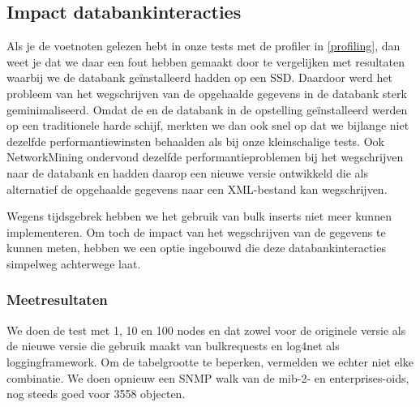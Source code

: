\subsection{Impact databankinteracties}
\label{impact-db}


Als je de voetnoten gelezen hebt in onze tests met de profiler in \cref{profiling},
dan weet je dat we daar een fout hebben gemaakt door te vergelijken met resultaten waarbij we de databank geïnstalleerd hadden op een SSD.
Daardoor werd het probleem van het wegschrijven van de opgehaalde gegevens in de databank sterk geminimaliseerd.
Omdat de \nwmretriever{} en de databank in de \vwall{}opstelling geïnstalleerd werden op een traditionele harde schijf,
merkten we dan ook snel op dat we bijlange niet dezelfde performantiewinsten behaalden als bij onze kleinschalige tests.
Ook NetworkMining ondervond dezelfde performantieproblemen bij het wegschrijven naar de databank en hadden daarop een nieuwe versie ontwikkeld die als alternatief
de opgehaalde gegevens naar een XML-bestand kan wegschrijven.

Wegens tijdsgebrek hebben we het gebruik van bulk inserts niet meer kunnen implementeren.
Om toch de impact van het wegschrijven van de gegevens te kunnen meten,
hebben we een optie ingebouwd die deze databankinteracties simpelweg achterwege laat.

\subsubsection{Meetresultaten}

We doen de test met 1, 10 en 100 nodes en dat zowel voor de originele versie als de nieuwe versie die gebruik maakt van bulkrequests en log4net als loggingframework.
Om de tabelgrootte te beperken, vermelden we echter niet elke combinatie.
We doen opnieuw een SNMP walk van de mib-2- en enterprises-\glspl{oid}, nog steeds goed voor 3558 objecten.


